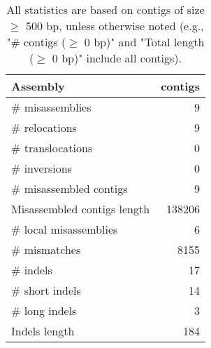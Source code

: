 \documentclass[12pt,a4paper]{article}
\begin{document}
\begin{table}[ht]
\begin{center}
\caption{All statistics are based on contigs of size $\geq$ 500 bp, unless otherwise noted (e.g., "\# contigs ($\geq$ 0 bp)" and "Total length ($\geq$ 0 bp)" include all contigs).}
\begin{tabular}{|l*{1}{|r}|}
\hline
Assembly & contigs \\ \hline
\# misassemblies & 9 \\ \hline
\hspace{5mm}\# relocations & 9 \\ \hline
\hspace{5mm}\# translocations & 0 \\ \hline
\hspace{5mm}\# inversions & 0 \\ \hline
\# misassembled contigs & 9 \\ \hline
Misassembled contigs length & 138206 \\ \hline
\# local misassemblies & 6 \\ \hline
\# mismatches & 8155 \\ \hline
\# indels & 17 \\ \hline
\hspace{5mm}\# short indels & 14 \\ \hline
\hspace{5mm}\# long indels & 3 \\ \hline
Indels length & 184 \\ \hline
\end{tabular}
\end{center}
\end{table}
\end{document}
